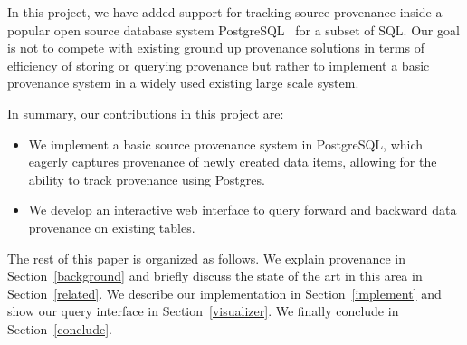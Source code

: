 In this project, we have added support for tracking source provenance inside a popular open source database system PostgreSQL~\cite{postgres} for a subset of SQL. Our goal is not to compete with existing ground up provenance solutions in terms of efficiency of storing or querying provenance but rather to implement a basic provenance system in a widely used existing large scale system.

In summary, our contributions in this project are:
\begin{itemize}
 \item We implement a basic source provenance system in PostgreSQL, which eagerly captures provenance of newly created data items, allowing for the ability to track provenance using Postgres.
\item We develop an interactive web interface to query forward and backward data provenance on existing tables.
\end{itemize}

The rest of this paper is organized as follows. We explain provenance in Section~\ref{background} and briefly discuss the state of the art in this area in Section~\ref{related}. We describe our implementation in Section~\ref{implement} and show our query interface in Section~\ref{visualizer}. We finally conclude in Section~\ref{conclude}.
